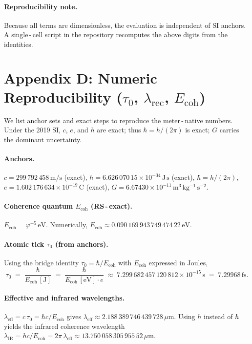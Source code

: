 \documentclass[11pt]{article}
\newcommand{\ph}{\varphi}
\newcommand{\lamrec}{\lambda_{\mathrm{rec}}}
\newcommand{\tauzero}{\tau_{0}}
\newcommand{\Ecoh}{E_{\mathrm{coh}}}
\theoremstyle{remark}
\begin{document}
\paragraph{Reproducibility note.}
Because all terms are dimensionless, the evaluation is independent of SI anchors. A
single\,\mbox{-}\,cell script in the repository recomputes the above digits from the identities.

\bigskip
\section*{Appendix D: Numeric Reproducibility (\texorpdfstring{$\tauzero$}{tau0}, \texorpdfstring{$\lamrec$}{lambda\_rec}, \texorpdfstring{$\Ecoh$}{E\_coh})}
We list anchor sets and exact steps to reproduce the meter\,\mbox{-}\,native numbers. Under the 2019 SI,
$c$, $e$, and $h$ are exact; thus $\hbar = h/(2\pi)$ is exact; $G$ carries the dominant uncertainty.

\paragraph{Anchors.}
\(c = 299\,792\,458\,\mathrm{m/s}\) (exact), $h = 6.626\,070\,15\times 10^{-34}\,\mathrm{J\,s}$ (exact),
$\hbar = h/(2\pi)$, $e = 1.602\,176\,634\times 10^{-19}\,\mathrm{C}$ (exact), $G = 6.67430\times 10^{-11}\,\mathrm{m^{3}\,kg^{-1}\,s^{-2}}$.

\paragraph{Coherence quantum $\Ecoh$ (RS\,\mbox{-}\,exact).}
\(\Ecoh = \ph^{-5}\,\mathrm{eV}\). Numerically,
\(\Ecoh \approx 0.090\,169\,943\,749\,474\,22\,\mathrm{eV}\).

\paragraph{Atomic tick $\tauzero$ (from anchors).}
Using the bridge identity $\tauzero = \hbar/\Ecoh$ with $\Ecoh$ expressed in Joules,
\[
  \tauzero \;=\; \frac{\hbar}{\Ecoh\,[\mathrm{J}]}
  \;=\; \frac{\hbar}{\Ecoh\,[\mathrm{eV}]\cdot e}
  \;\approx\; 7.299\,682\,457\,120\,812\times 10^{-15}\,\mathrm{s} \;=\; 7.29968\,\mathrm{fs}.
\]

\paragraph{Effective and infrared wavelengths.}
\(\lambda_{\mathrm{eff}} = c\,\tauzero = \hbar c/\Ecoh\) gives
\(\lambda_{\mathrm{eff}} \approx 2.188\,389\,746\,439\,728\,\mu\mathrm{m}\).
Using $h$ instead of $\hbar$ yields the infrared coherence wavelength
\(\lambda_{\mathrm{IR}} = h c/\Ecoh = 2\pi\,\lambda_{\mathrm{eff}} \approx 13.750\,058\,305\,955\,52\,\mu\mathrm{m}\).
\end{document}
